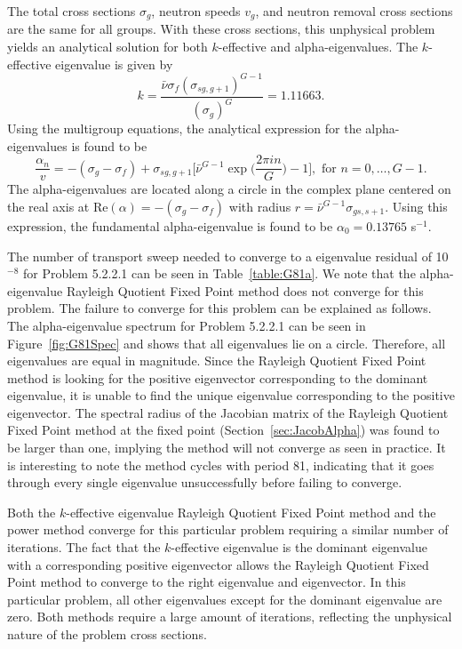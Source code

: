 The total cross sections $\sigma_{g}$, neutron speeds $v_{g}$, and neutron removal cross sections are the same for all groups. With these cross sections, this unphysical problem yields an analytical solution for both $k$-effective and alpha-eigenvalues. The $k$-effective eigenvalue is given by
\begin{equation}
	k = \frac{\bar{\nu} \sigma_{f} (\sigma_{sg,g+1})^{G-1}}{(\sigma_{g})^{G}} = 1.11663.
\end{equation}
Using the multigroup equations, the analytical expression for the alpha-eigenvalues is found to be
\begin{equation}
\frac{\alpha_{n}}{v} = -(\sigma_{g} - \sigma_{f}) + \sigma_{sg,g+1} \bigg [ \bar{\nu}^{G-1} \exp \bigg ( \frac{2 \pi i n}{G} \bigg ) - 1 \bigg ], \text{ for } n = 0, \dots, G-1. 
\end{equation}
The alpha-eigenvalues are located along a circle in the complex plane centered on the real axis at $\text{Re}(\alpha) = -(\sigma_{g} - \sigma_{f})$ with radius $r = \bar{\nu}^{G-1} \sigma_{gs,s+1}$. Using this expression, the fundamental alpha-eigenvalue is found to be $\alpha_{0} = 0.13765$ s$^{-1}$. 

The number of transport sweep needed to converge to a eigenvalue residual of 10$^{-8}$ for Problem 5.2.2.1 can be seen in Table~\ref{table:G81a}. We note that the alpha-eigenvalue Rayleigh Quotient Fixed Point method does not converge for this problem. The failure to converge for this problem can be explained as follows. The alpha-eigenvalue spectrum for Problem 5.2.2.1 can be seen in Figure~\ref{fig:G81Spec} and shows that all eigenvalues lie on a circle. Therefore, all eigenvalues are equal in magnitude. Since the Rayleigh Quotient Fixed Point method is looking for the positive eigenvector corresponding to the dominant eigenvalue, it is unable to find the unique eigenvalue corresponding to the positive eigenvector. The spectral radius of the Jacobian matrix of the Rayleigh Quotient Fixed Point method at the fixed point (Section~\ref{sec:JacobAlpha}) was found to be larger than one, implying the method will not converge as seen in practice. It is interesting to note the method cycles with period 81, indicating that it goes through every single eigenvalue unsuccessfully before failing to converge.

Both the $k$-effective eigenvalue Rayleigh Quotient Fixed Point method and the power method converge for this particular problem requiring a similar number of iterations. The fact that the $k$-effective eigenvalue is the dominant eigenvalue with a corresponding positive eigenvector allows the Rayleigh Quotient Fixed Point method to converge to the right eigenvalue and eigenvector. In this particular problem, all other eigenvalues except for the dominant eigenvalue are zero. Both methods require a large amount of iterations, reflecting the unphysical nature of the problem cross sections. 

